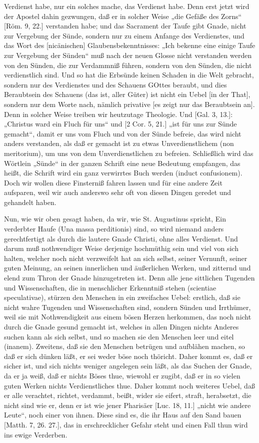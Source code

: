 Verdienst habe, nur ein solches mache, das Verdienst habe. Denn erst jetzt wird der Apostel dahin gezwungen, daß er in solcher Weise „die Gefäße des Zorns“ [Röm. 9, 22.] verstanden habe; und das Sacrament der Taufe gibt Gnade, nicht zur Vergebung der Sünde, sondern nur zu einem Anfange des Verdienstes, und das Wort des [nicänischen] Glaubensbekenntnisses: „Ich bekenne eine einige Taufe zur Vergebung der Sünden“ muß nach der neuen Glosse nicht verstanden werden von den Sünden, die zur Verdammniß führen, sondern von den Sünden, die nicht verdienstlich sind. Und so hat die Erbsünde keinen Schaden in die Welt gebracht, sondern nur des Verdienstes und des Schauens GOttes beraubt, und dies Beraubtsein des Schauens (das ist, aller Güter) ist nicht ein Uebel [in der That], sondern nur dem Worte nach, nämlich privative [es zeigt nur das Beraubtsein an]. Denn in solcher Weise treiben wir heutzutage Theologie. Und [Gal. 3, 13.]: „Christus ward ein Fluch für uns“ und [2 Cor. 5, 21.] „ist für uns zur Sünde gemacht“, damit er uns vom Fluch und von der Sünde befreie, das wird nicht anders verstanden, als daß er gemacht ist zu etwas Unverdienstlichem (non meritorium), um uns von dem Unverdienstlichen zu befreien. Schließlich wird das Wörtlein „Sünde“ in der ganzen Schrift eine neue Bedeutung empfangen, das heißt, die Schrift wird ein ganz verwirrtes Buch werden (induct confusionem). Doch wir wollen diese Finsterniß fahren lassen und für eine andere Zeit aufsparen, weil wir auch anderswo sehr oft von diesen Dingen geredet und gehandelt haben.

Nun, wie wir oben gesagt haben, da wir, wie St. Augustinus spricht, Ein verderbter Haufe (Una massa perditionis) sind, so wird niemand anders gerechtfertigt als durch die lautere Gnade Christi, ohne alles Verdienst. Und darum muß nothwendiger Weise derjenige hochmüthig sein und viel von sich halten, welcher noch nicht verzweifelt hat an sich selbst, seiner Vernunft, seiner guten Meinung, an seinen innerlichen und äußerlichen Werken, und zitternd und elend zum Thron der Gnade hinzugetreten ist. Denn alle jene sittlichen Tugenden und Wissenschaften, die in menschlicher Erkenntniß stehen (scientiae speculativae), stürzen den Menschen in ein zweifaches Uebel: erstlich, daß sie nicht wahre Tugenden und Wissenschaften sind, sondern Sünden und Irrthümer, weil sie mit Nothwendigkeit aus einem bösen Herzen herkommen, das noch nicht durch die Gnade gesund gemacht ist, welches in allen Dingen nichts Anderes suchen kann als sich selbst, und so machen sie den Menschen leer und eitel (inanem). Zweitens, daß sie den Menschen betrügen und aufblähen machen, so daß er sich dünken läßt, er sei weder böse noch thöricht. Daher kommt es, daß er sicher ist, und sich nichts weniger angelegen sein läßt, als das Suchen der Gnade, da er ja weiß, daß er nichts Böses thue, wiewohl er zugibt, daß er in so vielen guten Werken nichts Verdienstliches thue. Daher kommt noch weiteres Uebel, daß er alle verachtet, richtet, verdammt, beißt, wider sie eifert, straft, herabsetzt, die nicht sind wie er, denn er ist wie jener Pharisäer [Luc. 18, 11.] „nicht wie andere Leute“, noch einer von ihnen. Diese sind es, die ihr Haus auf den Sand bauen [Matth. 7, 26. 27.], das in erschrecklicher Gefahr steht und einen Fall thun wird ins ewige Verderben.


